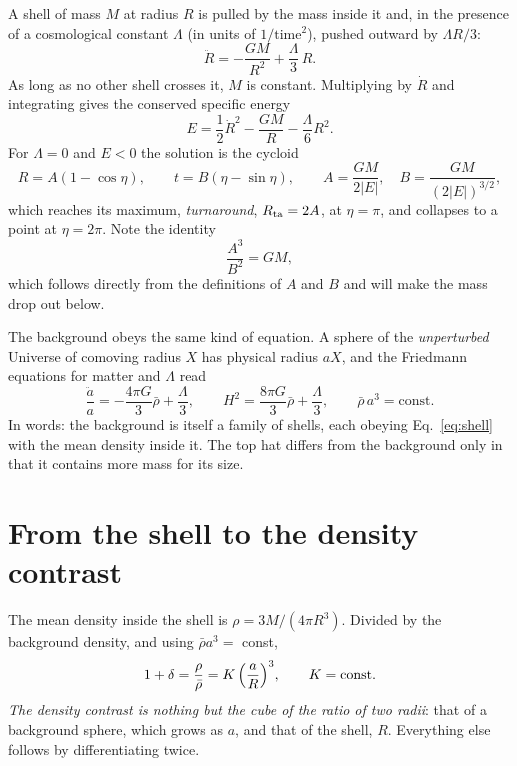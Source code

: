 \documentclass[11pt,a4paper]{article}
\begin{document}
A shell of mass $M$ at radius $R$ is pulled by the mass inside it and,
in the presence of a cosmological constant $\Lambda$ (in units of
$1/\text{time}^{2}$), pushed outward by $\Lambda R/3$:
\begin{equation}
  \ddot R=-\frac{GM}{R^{2}}+\frac{\Lambda}{3}\,R .
  \label{eq:shell}
\end{equation}
As long as no other shell crosses it, $M$ is constant. Multiplying by
$\dot R$ and integrating gives the conserved specific energy
\begin{equation}
  E=\frac12\dot R^{2}-\frac{GM}{R}-\frac{\Lambda}{6}R^{2}.
  \label{eq:energy}
\end{equation}
For $\Lambda=0$ and $E<0$ the solution is the cycloid
\begin{equation}
  R=A(1-\cos\eta),\qquad t=B(\eta-\sin\eta),\qquad
  A=\frac{GM}{2|E|},\quad B=\frac{GM}{(2|E|)^{3/2}},
  \label{eq:cycloid}
\end{equation}
which reaches its maximum, \emph{turnaround}, $R_{\rm ta}=2A$, at
$\eta=\pi$, and collapses to a point at $\eta=2\pi$. Note the identity
\begin{equation}
  \frac{A^{3}}{B^{2}}=GM ,
  \label{eq:AB}
\end{equation}
which follows directly from the definitions of $A$ and $B$ and will make
the mass drop out below.

The background obeys the same kind of equation. A sphere of the
\emph{unperturbed} Universe of comoving radius $X$ has physical radius
$aX$, and the Friedmann equations for matter and $\Lambda$ read
\begin{equation}
  \frac{\ddot a}{a}=-\frac{4\pi G}{3}\bar\rho+\frac{\Lambda}{3},\qquad
  H^{2}=\frac{8\pi G}{3}\bar\rho+\frac{\Lambda}{3},\qquad
  \bar\rho\,a^{3}=\text{const}.
  \label{eq:friedmann}
\end{equation}
In words: the background is itself a family of shells, each obeying
Eq.~\eqref{eq:shell} with the mean density inside it. The top hat
differs from the background only in that it contains more mass for its
size.

\section{From the shell to the density contrast}\label{sec:derivation}

The mean density inside the shell is $\rho=3M/(4\pi R^{3})$. Divided by
the background density, and using $\bar\rho a^{3}=$ const,
\begin{equation}
  1+\delta=\frac{\rho}{\bar\rho}=K\,\Bigl(\frac{a}{R}\Bigr)^{3},
  \qquad K=\text{const}.
  \label{eq:oneplusdelta}
\end{equation}
\emph{The density contrast is nothing but the cube of the ratio of two
radii}: that of a background sphere, which grows as $a$, and that of the
shell, $R$. Everything else follows by differentiating twice.
\end{document}
